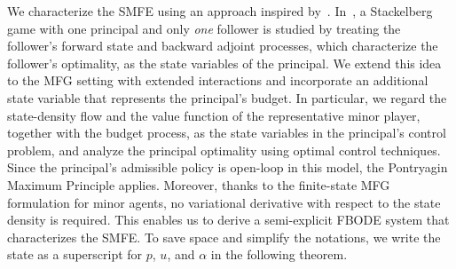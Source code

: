 \documentclass[letterpaper, 10 pt, conference]{ieeeconf}  %
\begin{document}
We characterize the SMFE using an approach inspired by~\cite{Bensoussan_2015}. In~\cite{Bensoussan_2015}, a Stackelberg game with one principal and only \textit{one} follower is studied by treating the follower's forward state and backward adjoint processes, which characterize the follower's optimality, as the state variables of the principal. We extend this idea to the MFG setting with extended interactions and incorporate an additional state variable that represents the principal's budget. In particular, we regard the state-density flow and the value function of the representative minor player, together with the budget process, as the state variables in the principal's control problem, and analyze the principal optimality using optimal control techniques. Since the principal's admissible policy is open-loop in this model, the Pontryagin Maximum Principle applies. Moreover, thanks to the finite-state MFG formulation for minor agents, no variational derivative with respect to the state density is required. This enables us to derive a semi-explicit FBODE system that characterizes the SMFE. To save space and simplify the notations, we write the state as a superscript for $p$, $u$, and $\alpha$ in the following theorem.
\end{document}
